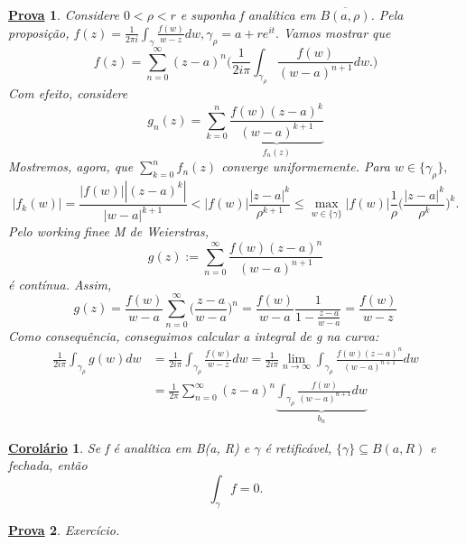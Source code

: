 \documentclass{article}
\newtheorem*{proof*}{\underline{Prova}}
\newtheorem*{crl*}{\underline{Corol\'ario}}
\begin{document}
\begin{proof*}
  Considere $0<\rho<r$ e suponha f anal\'itica em $\overline{B(a, \rho)}$. Pela proposi\c c\~ao, $f(z) =\displaystyle \frac{1}{2\pi i}\int_{\gamma}^{}\frac{f(w)}{w-z}dw,
\gamma_{\rho} = a + r e^{it}.$ Vamos mostrar que 
  $$  
  f(z) = \sum\limits_{n=0}^{\infty}(z-a)^n\biggl(\frac{1}{2i \pi}\int_{\gamma_{\rho}}^{}\frac{f(w)}{(w-a)^{n+1}}dw.\biggr)
  $$ 
  Com efeito, considere
  $$
  g_{n}(z) = \sum\limits_{k=0}^{n}\underbrace{\frac{f(w)(z-a)^{k}}{(w-a)^{k+1}}}_{f_{n}(z)}
  $$
  Mostremos, agora, que $\sum\limits_{k=0}^{n}f_{n}(z)$ converge uniformemente. Para $w\in{\{\gamma_{\rho}\}},$
  $$
  |f_{k}(w)| = \frac{|f(w)||(z-a)^{k}|}{|w-a|^{k+1}} < |f(w)|\frac{|z-a|^{k}}{\rho^{k+1}}\leq \max_{w\in \{\gamma\}}|f(w)|\frac{1}{\rho}\biggl(\frac{|z-a|^k}{\rho^k}\biggr)^{k}.
  $$
  Pelo working finee M de Weierstras, 
  $$
  g(z):=\sum\limits_{n=0}^{\infty}\frac{f(w)(z-a)^{n}}{(w-a)^{n+1}}
  $$
  \'e cont\'inua. Assim,
  $$
  g(z) = \frac{f(w)}{w - a}\sum\limits_{n=0}^{\infty}\biggl(\frac{z-a}{w-a}\biggr)^{n} = \frac{f(w)}{w-a}\frac{1}{1-\frac{z-a}{w-a}} = \frac{f(w)}{w-z}
  $$
  Como consequ\^encia, conseguimos calcular a integral de g na curva:
 \begin{align*}
   \frac{1}{2i \pi}\int_{\gamma_{\rho}}^{}g(w)dw &= \frac{1}{2i \pi}\int_{\gamma_{\rho}}^{}\frac{f(w)}{w-z}dw = \frac{1}{2i \pi}\lim_{n\to\infty}\int_{\gamma_{\rho}}\frac{f(w)(z-a)^{n}}{(w-a)^{n+1}}dw\\
                                                 &= \frac{1}{2\pi}\sum\limits_{n=0}^{\infty}(z-a)^{n}\underbrace{\int_{\gamma_{\rho}}^{}\frac{f(w)}{(w-a)^{n+1}}dw}_{b_{n}}
 \end{align*}
\end{proof*}
\begin{crl*}
  Se f \'e anal\'itica em B(a, R) e $\gamma$ \'e retific\'avel, $\{\gamma\}\subseteq{B(a, R)}$ e fechada, ent\~ao
  $$
    \int_{\gamma}^{}f = 0.
  $$
\end{crl*}
\begin{proof*}
  Exerc\'icio.
\end{proof*}
\end{document}
